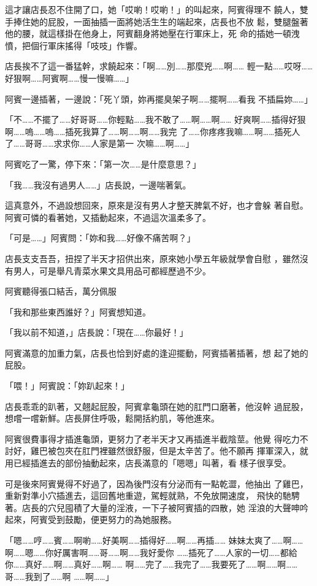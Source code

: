 這才讓店長忍不住開了口，她「哎喲！哎喲！」的叫起來，阿賓得理不
饒人，雙手捧住她的屁股，一面抽插一面將她活生生的端起來，店長也不放
鬆，雙腿盤著他的腰，就這樣掛在他身上，阿賓翻身將她壓在行軍床上，死
命的插她一頓洩憤，把個行軍床搖得「吱吱」作響。

店長挨不了這一番猛幹，求饒起來：「啊……別……那麼兇……啊……
輕一點……哎呀……好狠啊……阿賓啊……慢一慢嘛……」

阿賓一邊插著，一邊說：「死丫頭，妳再擺臭架子啊……擺啊……看我
不插扁妳……」

「不……不擺了……好哥哥……你輕點……我不敢了……啊……啊……
好爽啊……插得好狠啊……嗚……嗚……插死我算了……啊……啊……我完
了……你疼疼我嘛……啊……插死人了……哥哥……求求你……人家是第一
次嘛……啊……」

阿賓吃了一驚，停下來：「第一次……是什麼意思？」

「我……我沒有過男人……」店長說，一邊喘著氣。

這真意外，不過設想回來，原來是沒有男人才整天脾氣不好，也才會躲
著自慰。阿賓可憐的看著她，又插動起來，不過這次溫柔多了。

「可是……」阿賓問：「妳和我……好像不痛苦啊？」

店長支支吾吾，扭捏了半天才招供出來，原來她小學五年級就學會自慰
，雖然沒有男人，可是舉凡青菜水果文具用品可都經歷過不少。

阿賓聽得張口結舌，萬分佩服

「我和那些東西誰好？」阿賓想知道。

「我以前不知道，」店長說：「現在……你最好！」

阿賓滿意的加重力氣，店長也恰到好處的逢迎擺動，阿賓插著插著，想
起了她的屁股。

「喂！」阿賓說：「妳趴起來！」

店長乖乖的趴著，又翹起屁股，阿賓拿龜頭在她的肛門口磨著，他沒幹
過屁股，想嚐一嚐新鮮。店長屏住呼吸，鬆開括約肌，等他進來。

阿賓很費事得才插進龜頭，更努力了老半天才又再插進半截陰莖。他覺
得吃力不討好，雞巴被包夾在肛門裡雖然很舒服，但是太辛苦了。他不願再
揮軍深入，就用已經插進去的部份抽動起來，店長滿意的「嗯嗯」叫著，看
樣子很享受。

可是後來阿賓覺得不好過了，因為後門沒有分泌而有一點乾澀，他抽出
了雞巴，重新對準小穴插進去，這回舊地重遊，駕輕就熟，不免放開速度，
飛快的馳騁著。店長的穴兒囤積了大量的淫液，一下子被阿賓插的四散，她
淫浪的大聲呻吟起來，阿賓受到鼓勵，便更努力的為她服務。

「嗯……哼……賓……啊喲……好美啊……插得好……啊……再插……
妹妹太爽了……啊……啊……嗯……你好厲害啊……哥……啊……我好愛你
……插死了……人家的一切……都給你……真好……啊……真好……啊……
啊……完了……我完了……我要死了……啊……啊……哥……我到了……啊
……啊……」

